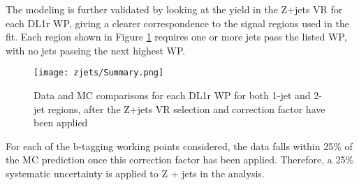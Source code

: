 The modeling is further validated by looking at the yield in the Z+jets VR for each DL1r WP, giving a clearer correspondence to the signal regions used in the fit. Each region shown in Figure \ref{fig:zjets_summary} requires one or more jets pass the listed WP, with no jets passing the next highest WP.                                                                    

                                                                                                                             
\begin{figure}[H]                                                                                                        
   \centering
   \texttt{[image: zjets/Summary.png]}
   \caption{Data and MC comparisons for each DL1r WP for both 1-jet and 2-jet regions, after the Z+jets VR selection and correction factor have been applied}                                                                                             
   \label{fig:zjets_summary}
\end{figure}

For each of the b-tagging working points considered, the data falls within 25\% of the MC prediction once this correction factor has been applied. Therefore, a 25\% systematic uncertainty is applied to Z + jets in the analysis.

